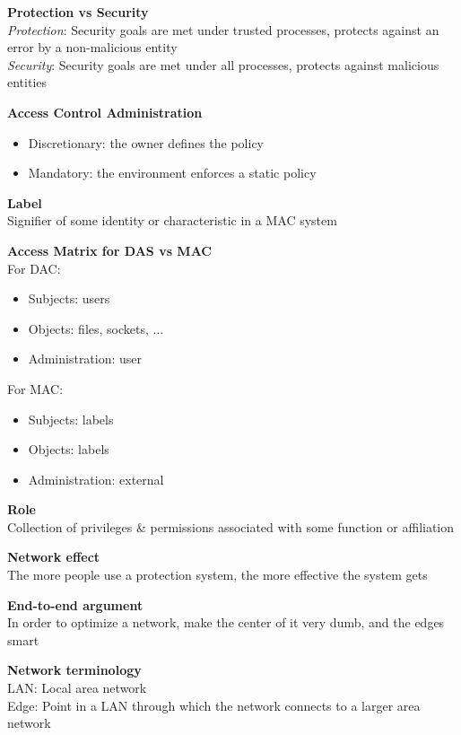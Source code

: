 \documentclass[10pt,letterpaper,landscape]{report}
\newcommand{\boxheight}{21.59cm}
\newcommand{\boxwidth}{8.85cm}
\begin{document}
\begin{small}
{\begin{minipage}[t][\boxheight][c]{\boxwidth}
		\textbf{Protection vs Security}\\
		\textit{Protection}: Security goals are met under trusted processes, protects against an error by a non-malicious entity\\
		\textit{Security}: Security goals are met under all processes, protects against malicious entities
		
		\textbf{Access Control Administration}
		\begin{itemize}
		    \item Discretionary: the owner defines the policy
		    \item Mandatory: the environment enforces a static policy
		\end{itemize}
		
		\textbf{Label}\\
		Signifier of some identity or characteristic in a MAC system
		
		\textbf{Access Matrix for DAS vs MAC}\\
		For DAC: 
		\begin{itemize}
		    \item Subjects: users
		    \item Objects: files, sockets, ...
		    \item Administration: user
		\end{itemize}
		For MAC: 
		\begin{itemize}
		    \item Subjects: labels
		    \item Objects: labels
		    \item Administration: external
		\end{itemize}
		
		\textbf{Role}\\
		Collection of privileges \& permissions associated with some function or affiliation
		
        \textbf{Network effect}\\
        The more people use a protection system, the more effective the system gets 
        
        \textbf{End-to-end argument}\\
        In order to optimize a network, make the center of it very dumb, and the edges smart
        
        \textbf{Network terminology}\\
        LAN: Local area network\\
        Edge: Point in a LAN through which the network connects to a larger area network
        


\end{minipage}}
\end{small}
\end{document}
